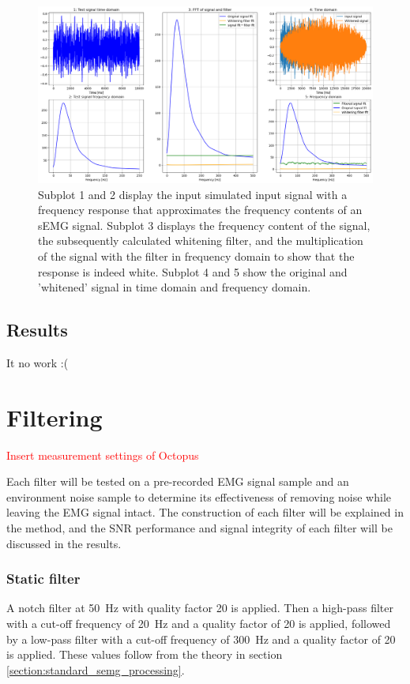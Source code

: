\begin{figure}[h!t]
	\begin{center}
		\includegraphics[width=1.0\columnwidth]{images/prewhitening_simulation.png}
	\end{center}
	\caption{Subplot 1 and 2 display the input simulated input signal with a frequency response that approximates the frequency contents of an sEMG signal. Subplot 3 displays the frequency content of the signal, the subsequently calculated whitening filter, and the multiplication of the signal with the filter in frequency domain to show that the response is indeed white. Subplot 4 and 5 show the original and 'whitened' signal in time domain and frequency domain.}
	\label{fig:whitening_simulation}
\end{figure}


\subsection{Results}
It no work :(


\section{Filtering}

\textcolor{red}{Insert measurement settings of Octopus}

Each filter will be tested on a pre-recorded EMG signal sample and an environment noise sample to determine its effectiveness of removing noise while leaving the EMG signal intact. The construction of each filter will be explained in the method, and the SNR performance and signal integrity of each filter will be discussed in the results. 

\subsubsection{Static filter}
A notch filter at \SI{50}{\hertz} with quality factor 20 is applied. Then a high-pass filter with a cut-off frequency of \SI{20}{\hertz} and a quality factor of 20 is applied, followed by a low-pass filter with a cut-off frequency of \SI{300}{\hertz} and a quality factor of 20 is applied. These values follow from the theory in section \ref{section:standard_semg_processing}.

